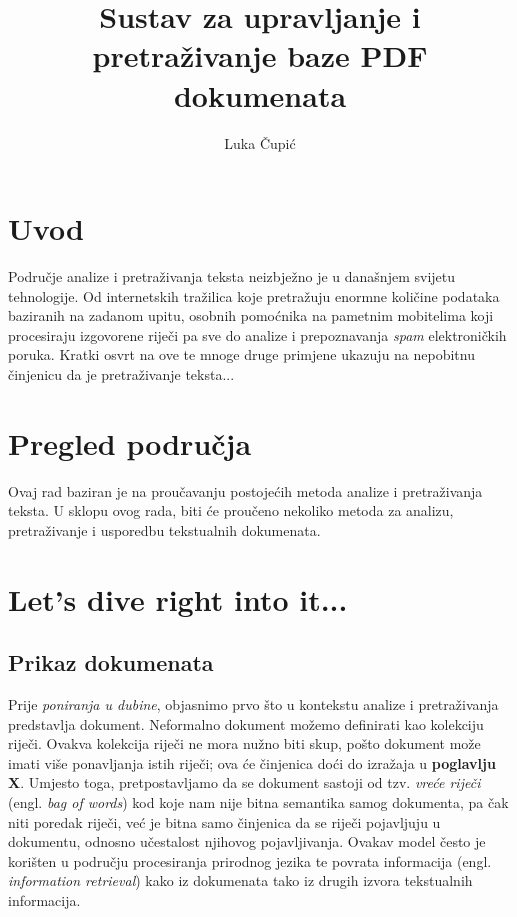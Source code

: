 \documentclass[times, utf8, zavrsni]{fer}
\begin{document}

\title{Sustav za upravljanje i pretraživanje baze PDF dokumenata}

\author{Luka Čupić}

\maketitle

\izvornik

\zahvala{}

\tableofcontents

\chapter{Uvod}
Područje analize i pretraživanja teksta neizbježno je u današnjem svijetu tehnologije. Od internetskih tražilica koje pretražuju enormne količine podataka baziranih na zadanom upitu, osobnih pomoćnika na pametnim mobitelima koji procesiraju izgovorene riječi pa sve do analize i prepoznavanja \textit{spam} elektroničkih poruka.
Kratki osvrt na ove te mnoge druge primjene ukazuju na nepobitnu činjenicu da je pretraživanje teksta...

\chapter{Pregled područja}
Ovaj rad baziran je na proučavanju postojećih metoda analize i pretraživanja teksta. U sklopu ovog rada, biti će proučeno nekoliko metoda za analizu, pretraživanje i usporedbu tekstualnih dokumenata.

\chapter{Let's dive right into it...}

\section{Prikaz dokumenata}
Prije \textit{poniranja u dubine}, objasnimo prvo što u kontekstu analize i pretraživanja predstavlja dokument. Neformalno dokument možemo definirati kao kolekciju riječi. Ovakva kolekcija riječi ne mora nužno biti skup, pošto dokument može imati više ponavljanja istih riječi; ova će činjenica doći do izražaja u \textbf{poglavlju X}. Umjesto toga, pretpostavljamo da se dokument sastoji od  tzv. \textit{vreće riječi} (engl. \textit{bag of words}) kod koje nam nije bitna semantika samog dokumenta, pa čak niti poredak riječi, već je bitna samo činjenica da se riječi pojavljuju u dokumentu, odnosno učestalost njihovog pojavljivanja.
Ovakav model često je korišten u području procesiranja prirodnog jezika te povrata informacija (engl. \textit{information retrieval}) kako iz dokumenata tako iz drugih izvora tekstualnih informacija.
\end{document}
